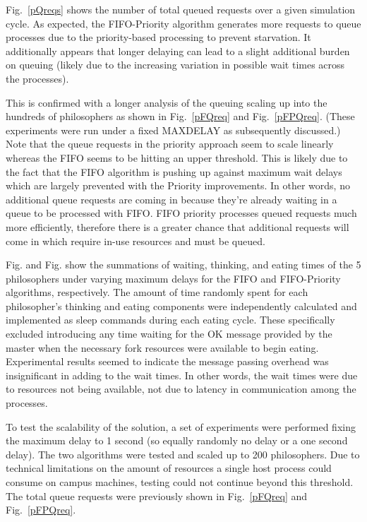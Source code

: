 \documentclass[conference,11pt]{IEEEtran}
\begin{document}
Fig.~\ref{pQreqs} shows the number of total queued requests over a given simulation cycle. As expected, the FIFO-Priority algorithm generates more requests to queue processes due to the priority-based processing to prevent starvation. It additionally appears that longer delaying can lead to a slight additional burden on queuing (likely due to the increasing variation in possible wait times across the processes).

This is confirmed with a longer analysis of the queuing scaling up into the hundreds of philosophers as shown in Fig.~\ref{pFQreq} and Fig.~\ref{pFPQreq}. (These experiments were run under a fixed MAXDELAY as subsequently discussed.) Note that the queue requests in the priority approach seem to scale linearly whereas the FIFO seems to be hitting an upper threshold. This is likely due to the fact that the FIFO algorithm is pushing up against maximum wait delays which are largely prevented with the Priority improvements. In other words, no additional queue requests are coming in because they're already waiting in a queue to be processed with FIFO. FIFO priority processes queued requests much more efficiently, therefore there is a greater chance that additional requests will come in which require in-use resources and must be queued.

Fig. and Fig. show the summations of waiting, thinking, and eating times of the 5 philosophers under varying maximum delays for the FIFO and FIFO-Priority algorithms, respectively. The amount of time randomly spent for each philosopher's thinking and eating components were independently calculated and implemented as sleep commands during each eating cycle. These specifically excluded introducing any time waiting for the OK message provided by the master when the necessary fork resources were available to begin eating. Experimental results seemed to indicate the message passing overhead was insignificant in adding to the wait times. In other words, the wait times were due to resources not being available, not due to latency in communication among the processes.

To test the scalability of the solution, a set of experiments were performed fixing the maximum delay to 1 second (so equally randomly no delay or a one second delay). The two algorithms were tested and scaled up to 200 philosophers. Due to technical limitations on the amount of resources a single host process could consume on campus machines, testing could not continue beyond this threshold. The total queue requests were previously shown in Fig.~\ref{pFQreq} and Fig.~\ref{pFPQreq}.
\end{document}
